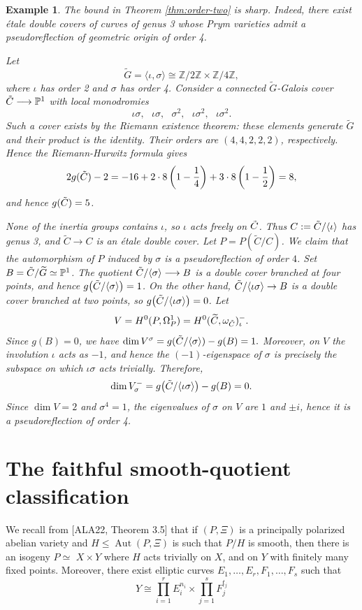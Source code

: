 \documentclass{article}
\newtheorem{exam}[thm]{Example}
\numberwithin{equation}{section}
\newcommand{\tC}{\Tilde{C}}
\begin{document}
\begin{exam}
\label{ex:order-four}
The bound in Theorem \ref{thm:order-two} is sharp. Indeed, there exist étale double covers of curves of genus 3 whose Prym varieties admit a pseudoreflection of geometric origin of order 4.

Let $$\widetilde G=\langle \iota,\sigma\rangle
\cong \mathbb Z/2\mathbb Z\times\mathbb Z/4\mathbb Z,$$
where $\iota$ has order 2 and $\sigma$ has order 4. Consider a connected $\widetilde G$-Galois cover $\tC\longrightarrow \mathbb{P}^1$ with local monodromies $$\iota\sigma,\ \ \ \iota\sigma,\ \ \ \sigma^2,\ \ \ \iota\sigma^2,\ \ \ \iota\sigma^2.$$
Such a cover exists by the Riemann existence theorem: these elements generate $\widetilde G$ and their product is the identity. Their orders are $(4,4,2,2,2)$, respectively. Hence the Riemann-Hurwitz formula gives
$$2g(\tC)-2 = -16+2\cdot 8\left(1-\frac14\right)+3\cdot 8\left(1-\frac12\right)=8,$$ and hence $g(\tC)=5$.

None of the inertia groups contains $\iota$, so $\iota$ acts freely on $\tC$. Thus $C:=\tC/\langle\iota\rangle$
has genus 3, and $\widetilde C\to C$ is an étale double cover. Let $P=P(\widetilde C/C)$. We claim that the automorphism of $P$ induced by $\sigma$ is a pseudoreflection of order $4$. Set $B=\tC/\widetilde G\simeq\mathbb P^1$. The quotient $\tC/\langle\sigma\rangle\longrightarrow B$
is a double cover branched at four points, and hence $g\bigl(\tC/\langle\sigma\rangle\bigr)=1$. On the other hand, $\tC/\langle\iota\sigma\rangle\to B$
is a double cover branched at two points, so
$g\bigl(\tC/\langle\iota\sigma\rangle\bigr)=0$. Let $$V=H^0(P,\Omega_P^1)=H^0(\widetilde C,\omega_{\tC})^{-}_{\iota}.$$
Since $g(B)=0$, we have $\dim V^{\sigma}= g(\tC/\langle \sigma \rangle) - g(B) =1.$
Moreover, on $V$ the involution $\iota$ acts as $-1$, and hence the $(-1)$-eigenspace of $\sigma$ is precisely the subspace on which $\iota\sigma$ acts trivially. Therefore, $$\dim V^{-}_{\sigma}=g\bigl(\tC/\langle\iota\sigma\rangle\bigr)-g(B)=0.$$
Since $\dim V=2$ and $\sigma^4=1$, the eigenvalues of $\sigma$ on $V$ are $1$ and $\pm i$, hence it is a pseudoreflection of order 4.
\end{exam}


\section{The faithful smooth-quotient classification}\label{sec:groups}

We recall from [ALA22, Theorem 3.5] that if \((P, \Xi)\) is a principally polarized abelian variety and \(H \leq \operatorname{Aut}(P, \Xi)\) is such that \(P / H\) is smooth, then there is an isogeny \(P \simeq\) \(X \times Y\) where \(H\) acts trivially on \(X\), and on \(Y\) with finitely many fixed points. Moreover, there exist elliptic curves \(E_1, \ldots, E_r, F_1, \ldots, F_s\) such that
\[
Y \cong \prod_{i=1}^r E_i^{n_i} \times \prod_{j=1}^s F_j^{t_j}
\]
\end{document}
